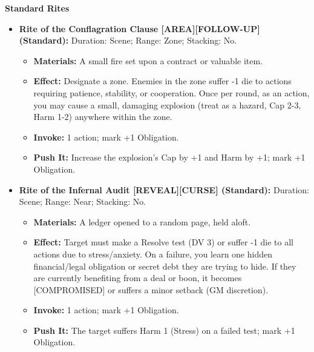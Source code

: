 \documentclass[11pt,letterpaper]{article}
\newcommand{\patronbox}[1]{\noindent\textbf{#1}\\}
\begin{document}
\patronbox{Standard Rites}
\begin{itemize}[leftmargin=*]
    \item \textbf{Rite of the Conflagration Clause [AREA][FOLLOW-UP] (Standard):} Duration: Scene; Range: Zone; Stacking: No.
    \begin{itemize}
        \item \textbf{Materials:} A small fire set upon a contract or valuable item.
        \item \textbf{Effect:} Designate a zone. Enemies in the zone suffer -1 die to actions requiring patience, stability, or cooperation. Once per round, as an action, you may cause a small, damaging explosion (treat as a hazard, Cap 2-3, Harm 1-2) anywhere within the zone.
        \item \textbf{Invoke:} 1 action; mark +1 Obligation.
        \item \textbf{Push It:} Increase the explosion's Cap by +1 and Harm by +1; mark +1 Obligation.
    \end{itemize}
    \item \textbf{Rite of the Infernal Audit [REVEAL][CURSE] (Standard):} Duration: Scene; Range: Near; Stacking: No.
    \begin{itemize}
        \item \textbf{Materials:} A ledger opened to a random page, held aloft.
        \item \textbf{Effect:} Target must make a Resolve test (DV 3) or suffer -1 die to all actions due to stress/anxiety. On a failure, you learn one hidden financial/legal obligation or secret debt they are trying to hide. If they are currently benefiting from a deal or boon, it becomes [COMPROMISED] or suffers a minor setback (GM discretion).
        \item \textbf{Invoke:} 1 action; mark +1 Obligation.
        \item \textbf{Push It:} The target suffers Harm 1 (Stress) on a failed test; mark +1 Obligation.
    \end{itemize}
\end{itemize}
\end{document}
